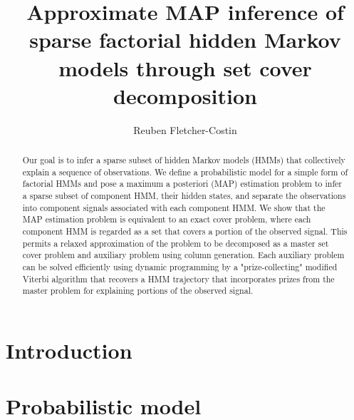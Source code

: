 \documentclass[twoside, 11pt]{article}
\begin{document}
\author{\name Reuben Fletcher-Costin}

\editor{}

\title{Approximate MAP inference of sparse factorial hidden Markov models through set cover decomposition}

\maketitle

\begin{abstract}%
Our goal is to infer a sparse subset of hidden Markov models (HMMs) that collectively explain a sequence of observations. We define a probabilistic model for a simple form of factorial HMMs and pose a maximum a posteriori (MAP) estimation problem to infer a sparse subset of component HMM, their hidden states, and separate the observations into component signals associated with each component HMM. We show that the MAP estimation problem is equivalent to an exact cover problem, where each component HMM is regarded as a set that covers a portion of the observed signal. This permits a relaxed approximation of the problem to be decomposed as a master set cover problem and auxiliary problem using column generation. Each auxiliary problem can be solved efficiently using dynamic programming by a "prize-collecting" modified Viterbi algorithm that recovers a HMM trajectory that incorporates prizes from the master problem for explaining portions of the observed signal.
\end{abstract}


\section{Introduction}


\section{Probabilistic model}
\end{document}
